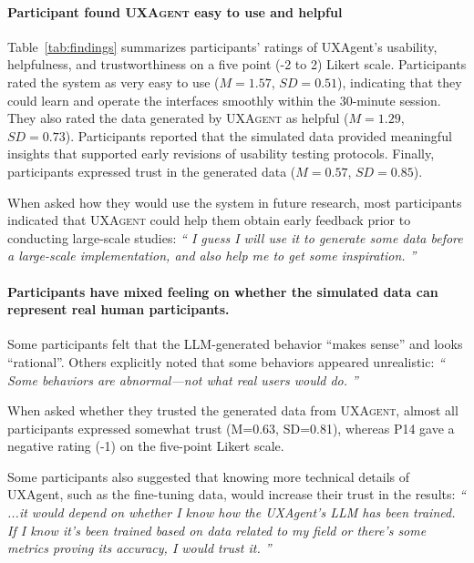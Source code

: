 \documentclass[manuscript,review,anonymous]{acmart}
\let\oldquote\quote
\let\oldendquote\endquote
\renewenvironment{quote}[1][]{
\def\speakername{#1}%
\oldquote
\itshape
``}{''
\normalshape
\hfill\ifthenelse{\equal{\speakername}{}}{}{(\speakername)}
\oldendquote
}
\DeclareRobustCommand{\projectname}{\textsc{UXAgent}\xspace}
\DeclareRobustCommand{\note}[1]{{\sethlcolor{orange!30!white}\hl{#1}}}
\begin{document}
\paragraph{\textbf{Participant found \projectname easy to use and helpful}}
Table~\ref{tab:findings} summarizes participants' ratings of UXAgent's usability, helpfulness, and trustworthiness on a five point (-2 to 2) Likert scale. Participants rated the system as very easy to use ($M=1.57$, $SD=0.51$), indicating that they could learn and operate the interfaces smoothly within the 30-minute session.  
They also rated the data generated by \projectname as helpful ($M=1.29$, $SD=0.73$). Participants reported that the simulated data provided meaningful insights that supported early revisions of usability testing protocols. 
Finally, participants expressed trust in the generated data ($M=0.57$, $SD=0.85$).

When asked how they would use the system in future research, most participants indicated that \projectname could help them obtain early feedback prior to conducting large-scale studies:  
\begin{quote}[P1]
I guess I will use it to generate some data before a large-scale implementation, and also help me to get some inspiration.
\end{quote}

\paragraph{\textbf{Participants have mixed feeling on whether the simulated data can represent real human participants.}} 

Some participants felt that the LLM-generated behavior ``makes sense'' and looks ``rational''.
Others explicitly noted that some behaviors appeared unrealistic:  
\begin{quote}[P6]
Some behaviors are abnormal---not what real users would do.
\end{quote}

When asked whether they trusted the generated data from \projectname, almost all participants expressed somewhat trust (M=0.63, SD=0.81), whereas P14 gave a negative rating (-1) on the five-point Likert scale.

Some participants also suggested that knowing more technical details of UXAgent, such as the fine-tuning data, would increase their trust in the results:  
\begin{quote}[P16]
...it would depend on whether I know how the UXAgent's LLM has been trained. If I know it's been trained based on data related to my field or there's some metrics proving its accuracy, I would trust it.
\end{quote}
\end{document}
